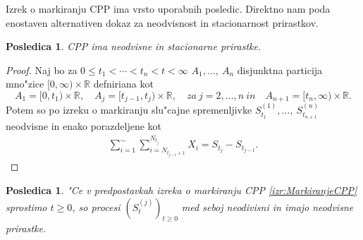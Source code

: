 \documentclass[12pt, a4paper, reqno]{amsart}
\theoremstyle{definition}
\theoremstyle{plain}
\newtheorem{posledica}[definicija]{Posledica}
\newcommand{\R}{\mathbb{R}}
\newcommand{\1}{\mathds{1}}
\begin{document}
        Izrek o markiranju CPP ima vrsto uporabnih posledic. Direktno nam poda enostaven
        alternativen dokaz za neodvisnost in stacionarnost prirastkov.

        \begin{posledica}
            CPP ima neodvisne in stacionarne prirastke.
        \end{posledica}

        \begin{proof}
            Naj bo za $0\leq t_1 < \cdots < t_n < t < \infty$ $A_1, \dots, \ A_n$ disjunktna particija 
            mno"zice $[0, \infty) \times \R$ defniriana kot
            \begin{equation*}
                A_1 = [0, t_1)\times \R, \quad A_j = [t_{j-1}, t_j)\times \R, \quad za \ j = 2, \dots, n \ in \quad A_{n + 1} = [t_{n}, \infty)\times \R.
            \end{equation*}
            Potem so po izreku o markiranju slu"cajne spremenljivke $S_{t_1}^{(1)}, \dots, \ S_{t_{n+1}}^{(n)}$ neodvisne in enako
            porazdeljene kot 
            \begin{align*}
                \sum_{i=1}^ \sim \sum_{i=N_{t_{j-1}+1}}^{N_{t_j}} X_i = S_{t_j} - S_{t_{j-1}}.
            \end{align*}
        \end{proof}

        \begin{posledica}
            "Ce v predpostavkah izreka o markiranju CPP \ref{izr:MarkiranjeCPP} sprostimo $t\geq0$, so procesi $(S_t^{(j)})_{t\geq0}$ 
            med seboj neodivisni in imajo neodvisne prirastke. 
        \end{posledica}
\end{document}
